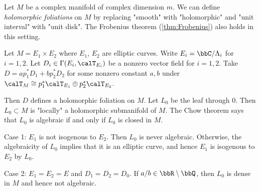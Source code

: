Let $M$ be a complex manifold of complex dimension $m$.
We can define \emph{holomorphic foliations} on $M$ by replacing "smooth" with "holomorphic" and "unit interval" with "unit disk".
The Frobenius theorem (\cref{thm:Frobenius}) also holds in this setting.

\begin{example}
  Let $M = E_1 \times E_2$ where $E_1$, $E_2$ are elliptic curves.
  Write $E_i = \bbC / \Lambda_i$ for $i = 1, 2$.
  Let $D_i \in \Gamma(E_i, \calT_{E_i})$ be a nonzero vector field for $i = 1, 2$.
  Take $D = a p_1^* D_1 + b p_2^* D_2$ for some nonzero constant $a, b$ under $\calT_M \cong p_1^* \calT_{E_1} \oplus p_2^* \calT_{E_2}$.

  Then $D$ defines a holomorphic foliation on $M$.
  Let $L_0$ be the leaf through $0$.
  Then $L_0 \subset M$ is "locally" a holomorphic submanifold of $M$.
  The Chow theorem says that $L_0$ is algebraic if and only if $L_0$ is closed in $M$.

  Case 1: $E_1$ is not isogenous to $E_2$.
  Then $L_0$ is never algebraic.
  Otherwise, the algebraicity of $L_0$ implies that it is an elliptic curve, and hence $E_1$ is isogenous to $E_2$ by $L_0$.

  Case 2: $E_1 = E_2 = E$ and $D_1 = D_2 = D_0$.
  If $a / b \in \bbR \setminus \bbQ$, then $L_0$ is dense in $M$ and hence not algebraic.
\end{example}